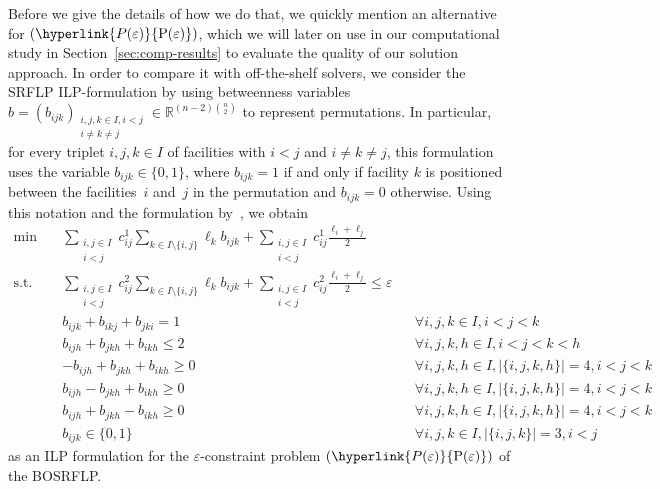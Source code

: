 \documentclass{article}
\newcommand{\myrefmath}[1]{(\hyperlink{#1}{\mathrm{#1}})}
\newcommand{\SRFLP}{SRFLP\xspace}
\newcommand{\BOSRFLP}{BOSRFLP\xspace}
\begin{document}
Before we give the details of how we do that, we quickly mention an alternative for $\myrefmath{P(\varepsilon)}$, which we will later on use in our computational study in Section~\ref{sec:comp-results} to evaluate the quality of our solution approach. In order to compare it with off-the-shelf solvers, we consider the \SRFLP ILP-formulation by \citet{amaral_new_2009} using betweenness variables~$b = (b_{ijk})_{\substack{{i,j,k \in I, i < j} \\i \neq k \neq j}} \in \mathbb R^{(n-2)\binom{n}{2}}$ to represent permutations. In particular, for every triplet $i,j,k \in I$ of facilities with $i < j$ and $i \neq k \neq j$, this formulation uses the variable $b_{ijk} \in \{0,1\}$, where $b_{ijk}=1$ if and only if facility $k$ is positioned between the facilities~$i$ and~$j$ in the permutation and $b_{ijk}=0$ otherwise. Using this notation and the formulation by~\citet{amaral_new_2009}, we obtain
\begin{subequations} \label{eq:BOSRFLPe-IP}
    \begin{align}
        \min \quad &\sum_{\substack{i,j \in I \\ i<j}} c_{ij}^1 \sum_{k \in I\setminus\{i,j\}} \ell_kb_{ijk} + \sum_{\substack{i,j \in I\\i<j}}c_{ij}^1 \frac{\ell_i + \ell_j}{2} \\
        \text{s.t. }\quad &\sum_{\substack{i,j \in I \\ i<j}} c_{ij}^2 \sum_{k \in I\setminus\{i,j\}} \ell_kb_{ijk} + \sum_{\substack{i,j \in I\\i<j}}c_{ij}^2 \frac{\ell_i + \ell_j}{2} \leq \varepsilon \\
         &b_{ijk}+b_{ikj}+b_{jki} = 1 && \forall i, j, k\in I, i<j<k \\
         &b_{ijh}+b_{jkh}+b_{ikh} \leq 2 && \forall i, j, k, h \in I, i<j<k<h \\
         &-b_{ijh}+b_{jkh}+b_{ikh} \geq 0 && \forall i, j, k, h \in I, |\{i, j, k, h\}|=4, i<j<k \\
         &b_{ijh}-b_{jkh}+b_{ikh} \geq 0 && \forall i, j, k, h \in I, |\{i, j, k, h\}|=4, i<j<k \\
         &b_{ijh}+b_{jkh}-b_{ikh} \geq 0 && \forall i, j, k, h \in I, |\{i, j, k, h\}|=4, i<j<k \\
         &b_{ijk} \in\{0,1\} && \forall i, j, k \in I, |\{i, j, k\}|=3 , i<j
    \end{align}
\end{subequations}
as an ILP formulation for the $\varepsilon$-constraint problem $\myrefmath{P(\varepsilon)}$ of the \BOSRFLP.
\end{document}
